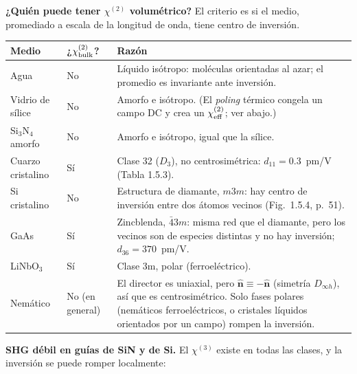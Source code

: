  \textbf{¿Quién puede tener $\chi^{(2)}$ volumétrico?} El criterio es si el medio, promediado a escala de la longitud de onda, tiene centro de inversión.
\begin{center}
\begin{tabular}{@{}p{3.2cm}p{2.2cm}p{9.8cm}@{}}\toprule
Medio & ¿$\chi^{(2)}_{\rm bulk}$? & Razón \\\midrule
Agua & No & Líquido isótropo: moléculas orientadas al azar; el promedio es invariante ante inversión.\\
Vidrio de sílice & No & Amorfo e isótropo. (El \emph{poling} térmico congela un campo DC y crea un $\chi^{(2)}_{\rm eff}$; ver abajo.)\\
Si$_3$N$_4$ amorfo & No & Amorfo e isótropo, igual que la sílice.\\
Cuarzo cristalino & Sí & Clase 32 ($D_3$), no centrosimétrica: $d_{11}=0.3$~pm/V (Tabla 1.5.3).\\
Si cristalino & No & Estructura de diamante, $m3m$: hay centro de inversión entre dos átomos vecinos (Fig.~1.5.4, p.~51).\\
GaAs & Sí & Zincblenda, $\bar43m$: misma red que el diamante, pero los vecinos son de especies distintas y no hay inversión; $d_{36}=370$~pm/V.\\
LiNbO$_3$ & Sí & Clase 3m, polar (ferroeléctrico).\\
Nemático & No (en general) & El director es uniaxial, pero $\hat{\mathbf n}\equiv-\hat{\mathbf n}$ (simetría $D_{\infty h}$), así que es centrosimétrico. Solo fases polares
(nemáticos ferroeléctricos, o cristales líquidos orientados por un campo) rompen la inversión.\\\bottomrule
\end{tabular}
\end{center}
\textbf{SHG débil en guías de SiN y de Si.} El $\chi^{(3)}$ existe en todas las clases, y la inversión se puede romper localmente:
